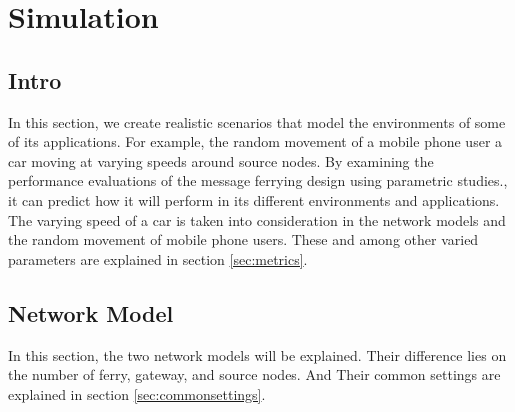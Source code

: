 \chapter{Simulation}

\section{Intro}

In this section, we create realistic scenarios that model the environments of some of its applications.  
For example, the random movement of a mobile phone user a car moving at varying speeds around source nodes.  
By examining the performance evaluations of the message ferrying design using parametric studies., it can predict how it will perform in its different environments and applications.
The varying speed of a car is taken into consideration in the network models and the random movement of mobile phone users.
These and among other varied parameters are explained in section \ref{sec:metrics}.


\section{Network Model}

In this section, the two network models will be explained.
Their difference lies on the number of ferry, gateway, and source nodes.
And 
Their common settings are explained in section \ref{sec:commonsettings}.



